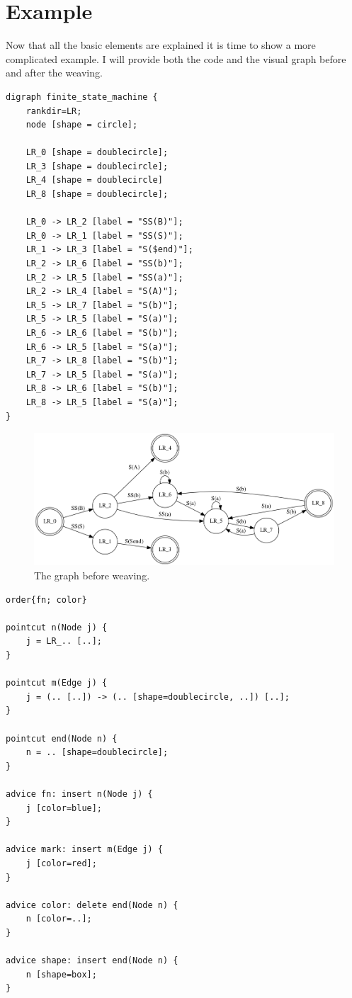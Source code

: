 \documentclass[a4paper]{report}
\begin{document}
\section{Example}
Now that all the basic elements are explained it is time to show a more complicated example. I will provide both the code and the visual graph before and after the weaving.
\begin{lstlisting}[multicols=2, caption=The source code.]
digraph finite_state_machine {
	rankdir=LR;
	node [shape = circle];

	LR_0 [shape = doublecircle];
	LR_3 [shape = doublecircle];
	LR_4 [shape = doublecircle]
	LR_8 [shape = doublecircle];

	LR_0 -> LR_2 [label = "SS(B)"];
	LR_0 -> LR_1 [label = "SS(S)"];
	LR_1 -> LR_3 [label = "S($end)"];
	LR_2 -> LR_6 [label = "SS(b)"];
	LR_2 -> LR_5 [label = "SS(a)"];
	LR_2 -> LR_4 [label = "S(A)"];
	LR_5 -> LR_7 [label = "S(b)"];
	LR_5 -> LR_5 [label = "S(a)"];
	LR_6 -> LR_6 [label = "S(b)"];
	LR_6 -> LR_5 [label = "S(a)"];
	LR_7 -> LR_8 [label = "S(b)"];
	LR_7 -> LR_5 [label = "S(a)"];
	LR_8 -> LR_6 [label = "S(b)"];
	LR_8 -> LR_5 [label = "S(a)"];
}
\end{lstlisting}
\begin{figure}
\includegraphics[width=\textwidth]{images/AOFDot/ExampleBefore.png}
\caption{The graph before weaving.}
\end{figure}
\begin{lstlisting}[multicols=2, caption=Aspect code.]
order{fn; color}

pointcut n(Node j) {
	j = LR_.. [..];
}

pointcut m(Edge j) {
	j = (.. [..]) -> (.. [shape=doublecircle, ..]) [..];
}

pointcut end(Node n) {
	n = .. [shape=doublecircle];
}

advice fn: insert n(Node j) {
	j [color=blue];
}

advice mark: insert m(Edge j) {
	j [color=red];
}

advice color: delete end(Node n) {
	n [color=..];
}

advice shape: insert end(Node n) {
	n [shape=box];
}
\end{lstlisting}
\end{document}
